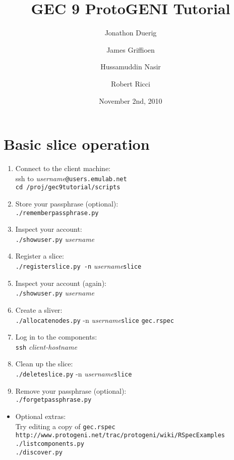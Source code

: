 \documentclass{article}
\title{GEC 9 ProtoGENI Tutorial}
\date{November 2nd, 2010}
\author{Jonathon Duerig \and James Griffioen \and Hussamuddin Nasir \and Robert Ricci}
\begin{document}
\maketitle
\section{Basic slice operation}
\begin{enumerate}
\item Connect to the client machine:\\
ssh to \emph{username}{\tt @users.emulab.net}\\
{\tt cd /proj/gec9tutorial/scripts}
\item Store your passphrase (optional):\\
{\tt ./rememberpassphrase.py}
\item Inspect your account:\\
{\tt ./showuser.py} \emph{username}
\item Register a slice:\\
{\tt ./registerslice.py -n} \emph{username}{\tt slice}
\item Inspect your account (again):\\
{\tt ./showuser.py} \emph{username}
\item Create a sliver:\\
{\tt ./allocatenodes.py} -n \emph{username}{\tt slice} {\tt gec.rspec}
\item Log in to the components:\\
{\tt ssh} \emph{client-hostname}
\item Clean up the slice:\\
{\tt ./deleteslice.py} -n \emph{username}{\tt slice}
\item Remove your passphrase (optional):\\
{\tt ./forgetpassphrase.py}
\end{enumerate}
\begin{itemize}
\item Optional extras:\\
Try editing a copy of {\tt gec.rspec}\\
{\tt http://www.protogeni.net/trac/protogeni/wiki/RSpecExamples}\\
{\tt ./listcomponents.py}\\
{\tt ./discover.py}
\end{itemize}
\end{document}
